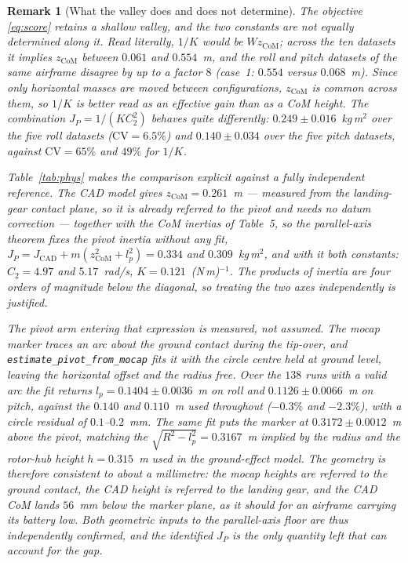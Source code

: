 \documentclass[10pt]{article}
\newtheorem{remark}{Remark}
\begin{document}
\begin{remark}[What the valley does and does not determine]
\label{rem:ridge}
The objective \eqref{eq:score} retains a shallow valley, and the two
constants are \emph{not} equally determined along it. Read literally,
$1/K$ would be $W z_{\mathrm{CoM}}$; across the ten datasets it implies
$z_{\mathrm{CoM}}$ between $0.061$ and $0.554$~m, and the roll and pitch
datasets of \emph{the same airframe} disagree by up to a factor $8$
(case~1: $0.554$ versus $0.068$~m). Since only horizontal masses are
moved between configurations, $z_{\mathrm{CoM}}$ is common across them,
so $1/K$ is better read as an effective gain than as a CoM height.
The combination $J_P = 1/(K C_2^2)$ behaves quite differently:
$0.249 \pm 0.016$~kg\,m$^2$ over the five roll datasets
($\mathrm{CV} = 6.5\%$) and $0.140 \pm 0.034$ over the five pitch
datasets, against $\mathrm{CV} = 65\%$ and $49\%$ for $1/K$.

Table~\ref{tab:phys} makes the comparison explicit against a fully
independent reference. The CAD model gives $z_{\mathrm{CoM}} = 0.261$~m
--- measured from the landing-gear contact plane, so it is already
referred to the pivot and needs no datum correction --- together with
the CoM inertias of Table~5, so the parallel-axis theorem fixes
the pivot inertia without any fit,
$J_P = J_{\mathrm{CAD}} + m(z_{\mathrm{CoM}}^2 + l_p^2)
     = 0.334$ and $0.309$~kg\,m$^2$,
and with it both constants: $C_2 = 4.97$ and $5.17$~rad/s,
$K = 0.121$~(N\,m)$^{-1}$. The products of inertia are four orders of
magnitude below the diagonal, so treating the two axes independently is
justified.

The pivot arm entering that expression is measured, not assumed. The
mocap marker traces an arc about the ground contact during the tip-over,
and \texttt{estimate\_pivot\_from\_mocap} fits it with the circle centre
held at ground level, leaving the horizontal offset and the radius free.
Over the $138$ runs with a valid arc the fit returns
$l_p = 0.1404 \pm 0.0036$~m on roll and $0.1126 \pm 0.0066$~m on pitch,
against the $0.140$ and $0.110$~m used throughout ($-0.3\%$ and
$-2.3\%$), with a circle residual of $0.1$--$0.2$~mm. The same fit puts
the marker at $0.3172 \pm 0.0012$~m above the pivot, matching the
$\sqrt{R^2 - l_p^2} = 0.3167$~m implied by the radius and the rotor-hub
height $h = 0.315$~m used in the ground-effect model. The geometry is
therefore consistent to about a millimetre: the mocap heights are
referred to the ground contact, the CAD height is referred to the
landing gear, and the CAD CoM lands $56$~mm below the marker plane, as
it should for an airframe carrying its battery low. Both geometric
inputs to the parallel-axis floor are thus independently confirmed, and
the identified $J_P$ is the only quantity left that can account for the
gap.


\end{remark}
\end{document}
